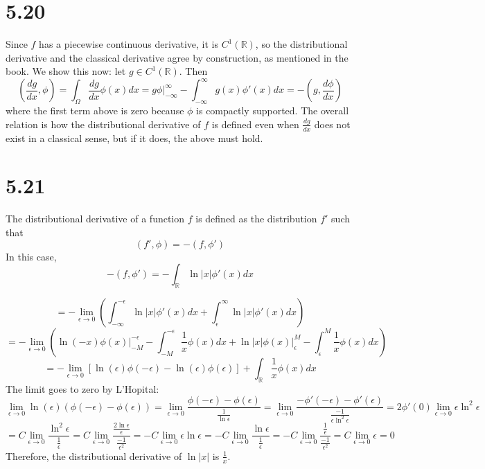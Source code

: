 \message{ !name(hw2.tex)}\documentclass{article}
\begin{document}
\section*{5.20}
Since $f$ has a piecewise continuous derivative, it is $C^1(\mathbb{R})$, so the distributional derivative and the classical derivative agree by construction, as mentioned in the book. We show this now: let $g\in C^1(\mathbb{R})$. Then
\[\left( \frac{dg}{dx}, \phi \right)=\int_\Omega \frac{d g}{d x} \phi(x)dx=g\phi\bigg|_{-\infty}^\infty-\int_{-\infty}^\infty g(x)\phi'(x)dx =-\left( g, \frac{d\phi}{dx} \right)\]
where the first term above is zero because $\phi$ is compactly supported. The overall relation is how the distributional derivative of $f$ is defined even when $\frac{dg}{dx}$ does not exist in a classical sense, but if it does, the above must hold.

\section*{5.21}
The distributional derivative of a function $f$ is defined as the distribution $f'$ such that
\[(f',\phi)=-(f, \phi')\]
In this case,
\[-(f, \phi')=-\int_\mathbb{R}\ln|x|\phi'(x)dx\]

\[=-\lim_{\epsilon\to 0}\left( \int_{-\infty}^{-\epsilon}\ln|x|\phi'(x)dx+\int_\epsilon^\infty\ln|x|\phi'(x)dx\right)\]
\[=-\lim_{\epsilon\to 0}\left( \ln(-x)\phi(x)\bigg|_{-M}^{-\epsilon}-\int_{-M}^{-\epsilon}\frac{1}{x}\phi(x)dx+\ln|x|\phi(x)\bigg|_\epsilon^M-\int_{\epsilon}^M\frac{1}{x}\phi(x)dx \right)\]
\[=-\lim_{\epsilon\to 0}\left[  \ln(\epsilon)\phi(-\epsilon)-\ln(\epsilon)\phi(\epsilon) \right]+\int_\mathbb{R}\frac{1}{x}\phi(x)dx\]
The limit goes to zero by L'Hopital:
\[\lim_{\epsilon\to 0}\ln(\epsilon)\left( \phi(-\epsilon)-\phi(\epsilon) \right)=\lim_{\epsilon\to 0}\frac{\phi(-\epsilon)-\phi(\epsilon)}{\frac{1}{\ln\epsilon}}=\lim_{\epsilon\to 0}\frac{-\phi'(-\epsilon)-\phi'(\epsilon)}{\frac{-1}{\epsilon\ln^2\epsilon}}=2\phi'(0)\lim_{\epsilon\to 0}\epsilon\ln^2\epsilon\]
\[=C\lim_{\epsilon\to 0} \frac{\ln^2\epsilon}{\frac{1}{\epsilon}}=C\lim_{\epsilon\to 0}\frac{\frac{2\ln\epsilon}{\epsilon}}{\frac{-1}{\epsilon^2}}=-C\lim_{\epsilon\to 0}\epsilon\ln\epsilon=-C\lim_{\epsilon\to 0}\frac{\ln\epsilon}{\frac{1}{\epsilon}}=-C\lim_{\epsilon\to 0}\frac{\frac{1}{\epsilon}}{\frac{-1}{\epsilon^2}}=C\lim_{\epsilon\to 0}\epsilon=0\]
Therefore, the distributional derivative of $\ln|x|$ is $\frac{1}{x}$.
\end{document}
